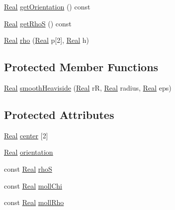 \begin{DoxyCompactItemize}
\item 
\hyperlink{_h_d_f5_dumper_8h_a445a5f0e2a34c9d97d69a3c2d1957907}{Real} \hyperlink{class_shape_ae79a82f1fa1a88c95927f02f8664f843}{get\+Orientation} () const 
\item 
\hyperlink{_h_d_f5_dumper_8h_a445a5f0e2a34c9d97d69a3c2d1957907}{Real} \hyperlink{class_shape_a8ce0a2058afdaf2644c84b8d065d5edf}{get\+Rho\+S} () const 
\item 
\hyperlink{_h_d_f5_dumper_8h_a445a5f0e2a34c9d97d69a3c2d1957907}{Real} \hyperlink{class_shape_af43ed0f7e4b90ba50be1c9ea05451353}{rho} (\hyperlink{_h_d_f5_dumper_8h_a445a5f0e2a34c9d97d69a3c2d1957907}{Real} p\mbox{[}2\mbox{]}, \hyperlink{_h_d_f5_dumper_8h_a445a5f0e2a34c9d97d69a3c2d1957907}{Real} h)
\end{DoxyCompactItemize}
\subsection*{Protected Member Functions}
\begin{DoxyCompactItemize}
\item 
\hyperlink{_h_d_f5_dumper_8h_a445a5f0e2a34c9d97d69a3c2d1957907}{Real} \hyperlink{class_shape_acbce5e61869b11226e3a45090387c7e9}{smooth\+Heaviside} (\hyperlink{_h_d_f5_dumper_8h_a445a5f0e2a34c9d97d69a3c2d1957907}{Real} r\+R, \hyperlink{_h_d_f5_dumper_8h_a445a5f0e2a34c9d97d69a3c2d1957907}{Real} radius, \hyperlink{_h_d_f5_dumper_8h_a445a5f0e2a34c9d97d69a3c2d1957907}{Real} eps)
\end{DoxyCompactItemize}
\subsection*{Protected Attributes}
\begin{DoxyCompactItemize}
\item 
\hyperlink{_h_d_f5_dumper_8h_a445a5f0e2a34c9d97d69a3c2d1957907}{Real} \hyperlink{class_shape_a865a04fe67fc785b3cbb44806a214248}{center} \mbox{[}2\mbox{]}
\item 
\hyperlink{_h_d_f5_dumper_8h_a445a5f0e2a34c9d97d69a3c2d1957907}{Real} \hyperlink{class_shape_a1778439509ada1f3fa64472610221d19}{orientation}
\item 
const \hyperlink{_h_d_f5_dumper_8h_a445a5f0e2a34c9d97d69a3c2d1957907}{Real} \hyperlink{class_shape_a181acdc3063f20a15ba1807f7b6a5d10}{rho\+S}
\item 
const \hyperlink{_h_d_f5_dumper_8h_a445a5f0e2a34c9d97d69a3c2d1957907}{Real} \hyperlink{class_shape_ad7d270a8ffc4056d4990424dffdd0488}{moll\+Chi}
\item 
const \hyperlink{_h_d_f5_dumper_8h_a445a5f0e2a34c9d97d69a3c2d1957907}{Real} \hyperlink{class_shape_af5aa25175d49bc463fada7b11f2735e1}{moll\+Rho}
\end{DoxyCompactItemize}


